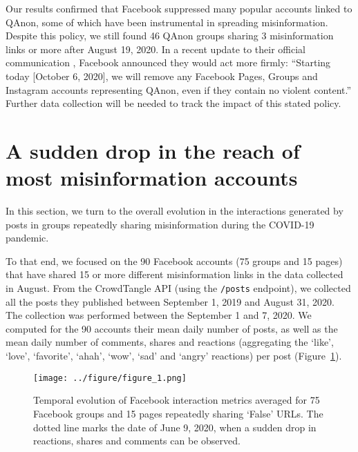 \documentclass[sigconf]{acmart}
\begin{document}
Our results confirmed that Facebook suppressed many popular accounts linked to QAnon, some of which have been instrumental in spreading misinformation. Despite this policy, we still found 46 QAnon groups sharing 3 misinformation links or more after August 19, 2020. In a recent update to their official communication \cite{FacebookQAnon}, Facebook announced they would act more firmly: ``Starting today [October 6, 2020], we will remove any Facebook Pages, Groups and Instagram accounts representing QAnon, even if they contain no violent content.'' Further data collection will be needed to track the impact of this stated policy.

\section{A sudden drop in the reach of most misinformation accounts}

In this section, we turn to the overall evolution in the interactions generated by posts in groups repeatedly sharing misinformation during the COVID-19 pandemic. 

To that end, we focused on the 90 Facebook accounts (75 groups and 15 pages) that have shared 15 or more different misinformation links in the data collected in August. From the CrowdTangle API (using the \verb|/posts| endpoint), we collected all the posts they published between September 1, 2019 and August 31, 2020. The collection was performed between the September 1 and 7, 2020. We computed for the 90 accounts their mean daily number of posts, as well as the mean daily number of comments, shares and reactions (aggregating the `like', `love', `favorite', `ahah', `wow', `sad' and `angry' reactions) per post (Figure~\ref{figure_1}).

\begin{figure}[h]
  \centering
  \texttt{[image: ../figure/figure\_1.png]}
  \caption{Temporal evolution of Facebook interaction metrics averaged for 75 Facebook groups and 15 pages repeatedly sharing `False' URLs. The dotted line marks the date of June 9, 2020, when a sudden drop in reactions, shares and comments can be observed.}
  \label{figure_1}
\end{figure}
\end{document}
